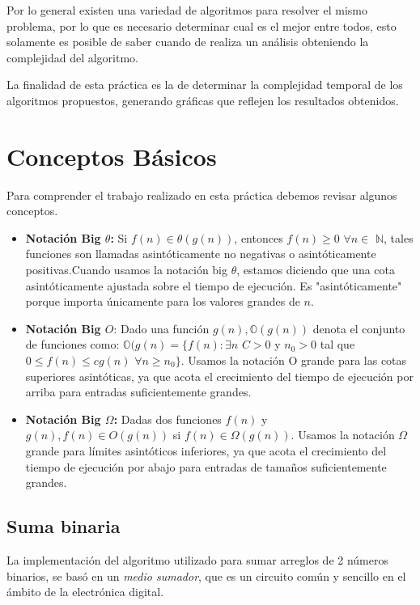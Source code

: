 \documentclass{report}
\begin{document}
    Por lo general existen una variedad de algoritmos para resolver el mismo problema, por lo que es necesario determinar cual es el mejor entre todos, esto solamente es posible de saber cuando de realiza un análisis obteniendo la complejidad del algoritmo.\par
    
    La finalidad de esta práctica es la de determinar la complejidad temporal de los algoritmos propuestos, generando gráficas que reflejen los resultados obtenidos.
    
\section*{Conceptos B\'asicos}
    Para comprender el trabajo realizado en esta práctica debemos revisar algunos conceptos.
    \begin{itemize}
        \item\textbf{Notaci\'on Big $\theta$:} Si $f(n)\in \theta (g(n))$, entonces $f(n)\geq 0$ $\forall n\in$ $\mathbb{N}$, tales funciones son llamadas asint\'oticamente no negativas o asint\'oticamente positivas.Cuando usamos la notaci\'on big $\theta$, estamos diciendo que una cota asint\'oticamente ajustada sobre el tiempo de ejecuci\'on. Es "asint\'oticamente" porque importa \'unicamente para los valores grandes de $n$. 
        \item\textbf{Notaci\'on Big $O$}: Dado una funci\'on $g(n),\mathbb{O}(g(n))$ denota el conjunto de funciones como: $\mathbb{O}(g(n) =\{f(n):\exists n$ $ C>0$ y $n_0>0$ tal que $0\le f(n) \le cg(n)$ $\forall n \geq n_0\}$. Usamos la notaci\'on O grande para las cotas superiores asint\'oticas, ya que acota el crecimiento del tiempo de ejecución por arriba para entradas suficientemente grandes.
        \item\textbf{Notaci\'on Big $\Omega$:} Dadas dos funciones $f(n)$ y $g(n), f(n)\in O(g(n))$ si $f(n)\in \Omega(g(n))$. Usamos la notaci\'on $\Omega$ grande para l\'imites asint\'oticos inferiores, ya que acota el crecimiento del tiempo de ejecuci\'on por abajo para entradas de tamaños suficientemente grandes.
    \end{itemize}
    
    \subsection*{Suma binaria}
         La implementación del algoritmo utilizado para sumar arreglos de 2 números binarios, se basó en un \textit{medio sumador}, que es un circuito común y sencillo en el ámbito de la electrónica digital.
                
\end{document}
